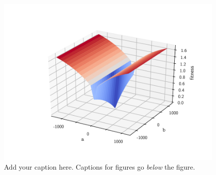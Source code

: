 %
%
%
\begin{figure}[t]
    \centering
    \includegraphics[width=\columnwidth]{graphics/figure.pdf}
    \caption{
        \label{fig:plain-figure}
        Add your caption here. Captions for figures go {\em below}
        the figure.
    }
\end{figure}